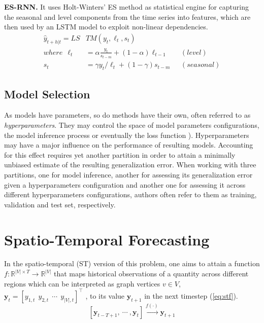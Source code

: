 \vspace{1em}
\noindent
\textbf{ES-RNN.} It uses Holt-Winters' ES method as statistical engine for capturing the seasonal and level components from the time series into features, which are then used by an LSTM model to exploit non-linear dependencies.
\begin{equation}\label{eq:esrnn}
    \begin{aligned}
    \hat{y}_{t+h|t} = LS&TM(y_t,\ell_t, s_t)\\
    where \ \ \ell_t &= \alpha \frac{y_t}{s_{t-m}} + (1-\alpha)\ell_{t-1}   &(level) \\
    s_t &= \gamma y_t/\ell_{t} + (1-\gamma)s_{t-m} \ \ \ &(seasonal)
    \end{aligned}
\end{equation}

\subsection{Model Selection}

As models have parameters, so do methods have their own, often referred to as \textit{hyperparameters}. They may control the space of model parameters configurations, the model inference process or eventually the loss function \cite{hutter2019automated}). Hyperparameters may have a major influence on the performance of resulting models. Accounting for this effect requires yet another partition in order to attain a minimally unbiased estimate of the resulting generalization error. When working with three partitions, one for model inference, another for assessing its generalization error given a hyperparameters configuration and another one for assessing it across different hyperparameters configurations, authors often refer to them as training, validation and test set, respectively.

\section{Spatio-Temporal Forecasting}\label{sec:stf}

In the spatio-temporal (ST) version of this problem, one aims to attain a function $f: \mathbb{R}^{|V|\times T} \rightarrow \mathbb{R}^{|V|}$ that maps historical observations of a quantity across different regions which can be interpreted as graph vertices $v\in V$, $\boldsymbol{y}_t = [y_{1,t}\  \  y_{2,t}\ \ \cdots \ \ y_{|V|,t}]^\top$ ,  to its value $\boldsymbol{y}_{t+1}$ in the next timestep  (\ref{eq:stf}).
\begin{equation}\label{eq:stf}
    [\boldsymbol{y}_{t-T+1}, \  \cdots\ , \boldsymbol{y}_{t}] \xrightarrow{f(\cdot)} \boldsymbol{y}_{t+1}
\end{equation}

